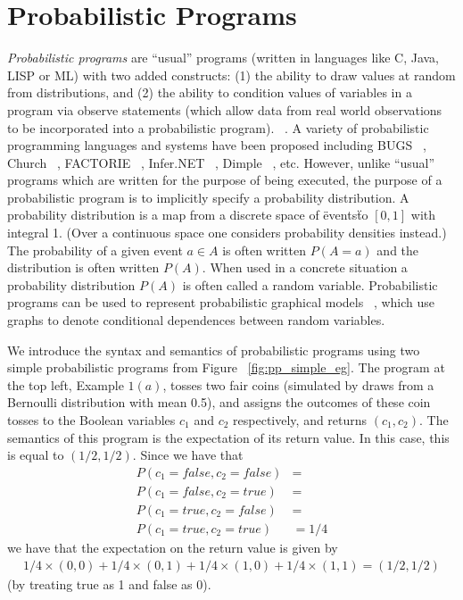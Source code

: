 \section{Probabilistic Programs}
\label{sec:pp}
\textit{Probabilistic programs} are “usual” programs (written in languages like C, Java, LISP or ML) with two added constructs: (1) the ability to draw values at random from distributions, and (2) the ability to condition values of variables in a program via observe statements (which allow data from real world observations to be incorporated into a probabilistic program). ~\cite{gordon2014}. A variety of probabilistic programming languages and systems have been proposed including BUGS ~\cite{bugs}, Church ~\cite{church}, FACTORIE ~\cite{factorie}, Infer.NET ~\cite{infernet}, Dimple ~\cite{dimple}, etc. However, unlike “usual” programs which are written for the purpose of being executed, the purpose of a probabilistic program is to implicitly specify a probability distribution. A probability distribution is a map from a discrete space of \"events\" to $[0,1]$ with integral 1. (Over a continuous space one considers probability densities instead.) The probability of a given event $a \in A$ is often written $P(A=a)$ and the distribution is often written $P(A)$. When used in a concrete situation a probability distribution $P(A)$ is often called a random variable. Probabilistic programs can be used to represent probabilistic graphical models ~\cite{pgm}, which use graphs to denote conditional dependences between random variables.

We introduce the syntax and semantics of probabilistic programs using two simple probabilistic programs from Figure ~\ref{fig:pp_simple_eg}. The program at the top left, Example $1(a)$, tosses two fair coins (simulated by draws from a Bernoulli distribution with mean 0.5), and assigns the outcomes of these coin tosses to the Boolean variables $c_1$ and $c_2$ respectively, and returns $(c_1, c_2)$. The semantics of this program is the expectation of its return value. In this case, this is equal to $(1/2, 1/2)$. Since we have that 
\begin{align*}
  P( c_1 = false, c_2 = false) &=\\
  P(c_1=false, c_2=true) &= \\
  P(c_1=true, c_2=false) &= \\
  P(c_1=true, c_2=true) &= 1/4
\end{align*}
we have that the expectation on the return value is given by 
\begin{align*}
  1/4 \times (0, 0) + 1/4\times (0, 1)+1/4 \times (1, 0)+1/4 \times (1, 1) = (1/2, 1/2)
\end{align*}
(by treating true as 1 and false as 0).

